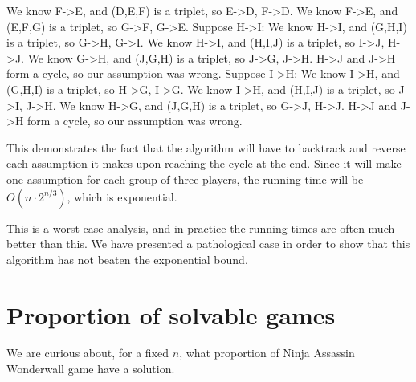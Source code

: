 \documentclass[12pt]{article}
\begin{document}
\begin{verbatimtab}
        We know F->E, and (D,E,F) is a triplet, so E->D, F->D.
        We know F->E, and (E,F,G) is a triplet, so G->F, G->E.
        Suppose H->I:
            We know H->I, and (G,H,I) is a triplet, so G->H, G->I.
            We know H->I, and (H,I,J) is a triplet, so I->J, H->J.
            We know G->H, and (J,G,H) is a triplet, so J->G, J->H.
            H->J and J->H form a cycle, so our assumption was wrong.
        Suppose I->H:
            We know I->H, and (G,H,I) is a triplet, so H->G, I->G.
            We know I->H, and (H,I,J) is a triplet, so J->I, J->H.
            We know H->G, and (J,G,H) is a triplet, so G->J, H->J.
            H->J and J->H form a cycle, so our assumption was wrong.
    \end{verbatimtab}

    This demonstrates the fact that the algorithm will have to backtrack and reverse each assumption it makes upon reaching the cycle at the end. Since it will make one assumption for each group of three players, the running time will be $O(n \cdot 2^{n/3})$, which is exponential. 

    This is a worst case analysis, and in practice the running times are often much better than this. We have presented a pathological case in order to show that this algorithm has not beaten the exponential bound.

\begin{comment}
\section{Overview: Steiner Triple Systems}
    Definition, examples
    discuss how the number of pairs dominates the number of players
    (this defeats our heuristic)
    A slightly better algorithm could `outsmart' our trap from the previous section, but the existence of Steiner Triple Systems shows that we can have so few repeated pairs as to render the heuristic useless. STS shows that this is a systemic problem. 
\end{comment}

\section{Proportion of solvable games}
    \label{sec:prob}
    We are curious about, for a fixed $n$, what proportion of Ninja Assassin Wonderwall game have a solution. 
\end{document}
